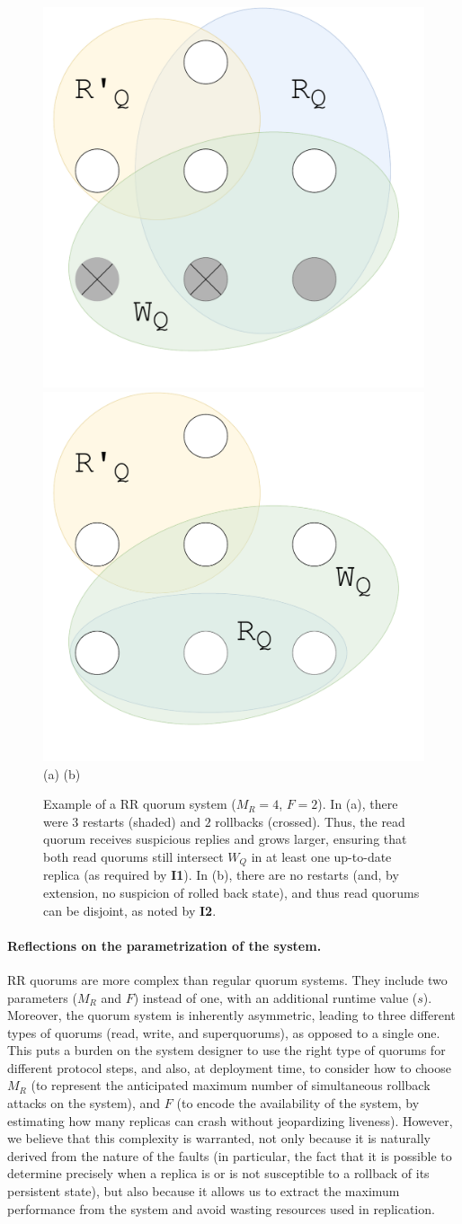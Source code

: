 \begin{figure}[t]
    \centering
        \includegraphics[width=.32\linewidth]{img/RR_quorums_I1}
        \includegraphics[width=.32\linewidth]{img/RR_quorums_I2}\\
        (a) \hspace{2.3cm} (b) \hspace{.2cm}
    \caption{Example of a \ac{RR} quorum system ($M_R=4$,
    $F=2$). In (a), there were $3$ restarts (shaded) and $2$ rollbacks
    (crossed). Thus, the read quorum receives suspicious replies and
    grows larger, ensuring that both read quorums still intersect $W_Q$ in
    at least one up-to-date replica (as required by \textbf{I1}).
    In (b), there are no restarts (and, by extension, no
    suspicion of rolled back state), and thus read quorums can be
    disjoint, as noted by \textbf{I2}.}\label{fig:quorums}
\end{figure}

\paragraph{Reflections on the parametrization of the system.}
\ac{RR} quorums are more complex than regular
quorum systems. They include two parameters ($M_R$ and $F$) instead of
one, with an additional runtime value ($s$). Moreover, the quorum
system is inherently asymmetric, leading to three different types of
quorums (read, write, and superquorums), as opposed to a single one.
This puts a burden on the system designer to use the right type of quorums for
different protocol steps, and also, at deployment time, to consider how to
choose $M_R$ (to represent the anticipated maximum number of simultaneous rollback
attacks on the system), and $F$
(to encode the availability of the system, by estimating how many replicas
can crash without jeopardizing liveness).
%
However, we believe that this complexity is warranted, not only
because it is naturally derived from the nature of the faults (in
particular, the fact that it is possible to determine precisely when a
replica is or is not susceptible to a rollback of its persistent
state), but also because it allows us to extract the maximum
performance from the system and avoid wasting resources used in
replication.

